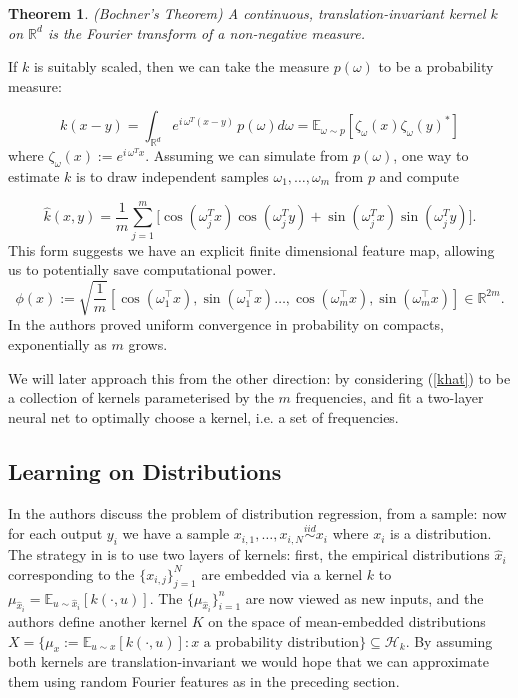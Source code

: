 \documentclass{article} %
\newtheorem{theorem}{Theorem}
\begin{document}
\begin{theorem} (Bochner's Theorem) \cite{Rahimi}
A continuous, translation-invariant kernel $k$ on $\mathbb{R}^d$ is the Fourier transform of a non-negative measure.
\end{theorem}

\noindent If $k$ is suitably scaled, then we can take the measure $p(\omega)$ to be a probability measure:

$$k(x-y)=\int_{\mathbb{R}^d} e^{i\,\omega^T (x-y)}\, p(\omega)d\omega=\mathbb{E}_{\omega\sim p}[\zeta_\omega(x) \zeta_\omega(y)^*]$$ where $\zeta_\omega(x):=e^{i\,\omega^T x}$. Assuming we can simulate from $p(\omega)$, one way to estimate $k$ is to draw independent samples $\omega_1,\dots,\omega_m$ from $p$ and compute

\begin{equation}
\label{khat}
 \hat{k}(x,y)=\frac{1}{m}\sum_{j=1}^m \big[\cos(\omega_j^T x)\cos(\omega_j^T y) + \sin (\omega_j^T x) \sin (\omega_j^T y)\big].
\end{equation}
This form suggests we have an explicit finite dimensional feature map, allowing us to potentially save computational power.
\begin{equation}
 \phi(x):=\sqrt{\frac{1}{m}}\left[\cos\left(\omega_1^\top x\right),\sin\left(\omega_1^\top x\right)\ldots,\cos\left(\omega_m^\top x\right),\sin\left(\omega_m^\top x\right)\right]\in\mathbb R^{2m}.
\end{equation}
\noindent In \cite{Rahimi} the authors proved uniform convergence in probability on compacts, exponentially as $m$ grows.

We will later approach this from the other direction: by considering (\ref{khat}) to be a collection of kernels parameterised by the $m$ frequencies, and fit a two-layer neural net to optimally choose a kernel, i.e. a set of frequencies.

\subsection{Learning on Distributions}

In \cite{Szabo} the authors discuss the problem of distribution regression, from a sample: now for each output $y_i$ we have a sample $x_{i,1},\dots,x_{i,N} 
\stackrel{iid}{\sim} x_i$ where $x_i$ is a distribution. The strategy in \cite{Szabo} is to use two layers of kernels: first, the empirical distributions $\hat{x}_i$ corresponding to the $\{x_{i,j}\}_{j=1}^N$ are embedded via a kernel $k$ to $\mu_{\hat{x}_i}=\mathbb{E}_{u \sim\hat{x}_i}[k(\cdot,u)]$. The $\{\mu_{\hat{x}_i}\}_{i=1}^n$ are now viewed as new inputs, and the authors define another kernel $K$ on the space of mean-embedded distributions $X=\{\mu_x:= \mathbb{E}_{u\sim x}[k(\cdot,u)]: x \text{ a probability distribution}\}\subseteq \mathcal{H}_k$. By assuming both kernels are translation-invariant we would hope that we can approximate them using random Fourier features as in the preceding section.
\end{document}
